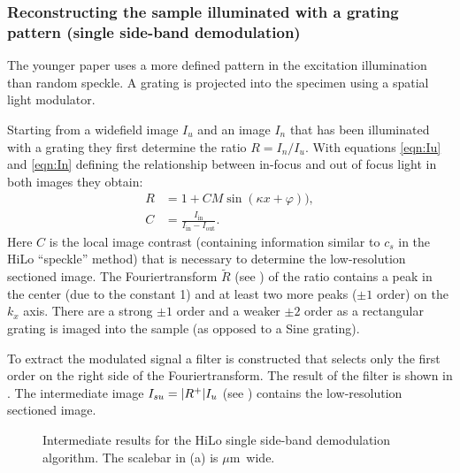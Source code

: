 \subsubsection{Reconstructing the sample illuminated with a grating
  pattern (single side-band demodulation)}
The younger paper \cite{2009Santos} uses a more defined pattern in the
excitation illumination than random speckle. A grating is projected
into the specimen using a spatial light modulator.

Starting from a widefield image $I_u$ and an image $I_n$ that has been
illuminated with a grating they first determine the ratio $R=I_n/I_u$.
With equations \eqref{eqn:Iu} and \eqref{eqn:In} defining the
relationship between in-focus and out of focus light in both images
they obtain:
\begin{align}
  R&=1+CM\sin(\kappa x+\varphi)),\\
  C&=\frac{I_\textrm{in}}{I_\textrm{in}-I_\textrm{out}}.
\end{align}
Here $C$ is the local image contrast (containing information similar
to $c_s$ in the HiLo ``speckle'' method) that is necessary to
determine the low-resolution sectioned image. The Fouriertransform
$\tilde R$ (see ) of the ratio contains a peak in the
center (due to the constant 1) and at least two more peaks ($\pm 1$
order) on the $k_x$ axis. There are a strong $\pm 1$ order and a
weaker $\pm 2$ order as a rectangular grating is imaged into the
sample (as opposed to a Sine grating).

To extract the modulated signal a filter is constructed that selects
only the first order on the right side of the Fouriertransform. The
result of the filter is shown in . The intermediate
image $I_{su}=\mathopen| R^+ \mathclose|I_u$ (see ) contains the
low-resolution sectioned image.

\begin{figure}[htb]
  \centering {}
  \caption{Intermediate results for the HiLo single side-band
    demodulation algorithm. The scalebar in (a) is \unit[2]{$\mu$m}
    wide.}
  \label{fig:hilo2}
\end{figure}

